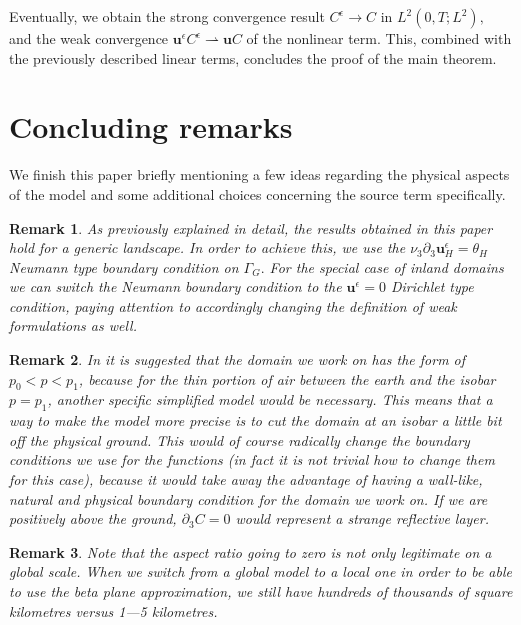 \documentclass[11pt]{article}
\newtheorem{remark}{Remark}
\begin{document}
Eventually, we obtain the strong convergence result $C^\epsilon \to C$ in $L^2(0,T; L^2),$ and the weak convergence $\mathbf{u}^\epsilon C^\epsilon \rightharpoonup \mathbf{u} C$ of the nonlinear term. This, combined with the previously described linear terms, concludes the proof of the main theorem.

\section{Concluding remarks} \label{concludingremarks}

We finish this paper briefly mentioning a few ideas regarding the physical aspects of the model and some additional choices concerning the source term specifically.

\begin{remark}
\normalfont
As previously explained in detail, the results obtained in this paper hold for a generic landscape. In order to achieve this, we use the $\nu_3 \partial_3 \mathbf{u}_H^\epsilon = \theta_H$ Neumann type boundary condition on $\Gamma_G.$ For the special case of inland domains we can switch the Neumann boundary condition to the $\mathbf{u}^\epsilon = 0$ Dirichlet type condition, paying attention to accordingly changing the definition of weak formulations as well.
\end{remark}

\begin{remark}
\normalfont In \cite{temam2005some} it is suggested that the domain we work on has the form of $p_0 < p < p_1$, because for the thin portion of air between the earth and the isobar $p = p_1$, another specific simplified model would be necessary. This means that a way to make the model more precise is to cut the domain at an isobar a little bit off the physical ground. This would of course radically change the boundary conditions we use for the functions (in fact it is not trivial how to change them for this case), because it would take away the advantage of having a wall-like, natural and physical boundary condition for the domain we work on. If we are positively above the ground, $\partial_3 C = 0$ would represent a strange reflective layer.
\end{remark}

\begin{remark}
\normalfont Note that the aspect ratio going to zero is not only legitimate on a global scale. When we switch from a global model to a local one in order to be able to use the beta plane approximation, we still have hundreds of thousands of square kilometres versus 1---5 kilometres.
\end{remark}
\end{document}
